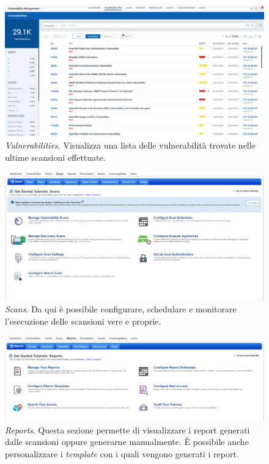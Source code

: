 \documentclass[target=mst,aauheader=]{thud}
\begin{document}
\begin{figure}
\centering
\includegraphics[scale=0.329]{images/qualys_vuln.png}
    \caption{\textit{Vulnerabilities}. Visualizza una lista delle vulnerabilità trovate nelle ultime scansioni effettuate.}
\end{figure}

\begin{figure}
\centering
\includegraphics[scale=0.329]{images/qualys_scans.png}
    \caption{\textit{Scans}. Da qui è possibile configurare, schedulare e monitorare l'esecuzione delle scansioni vere e proprie.}
\end{figure}

\begin{figure}
\centering
\includegraphics[scale=0.329]{images/qualys_reports.png}
    \caption{\textit{Reports}. Questa sezione permette di visualizzare i report generati dalle scansioni oppure generarne manualmente. È possibile anche personalizzare i \textit{template} con i quali vengono generati i report.}
\end{figure}
\end{document}
